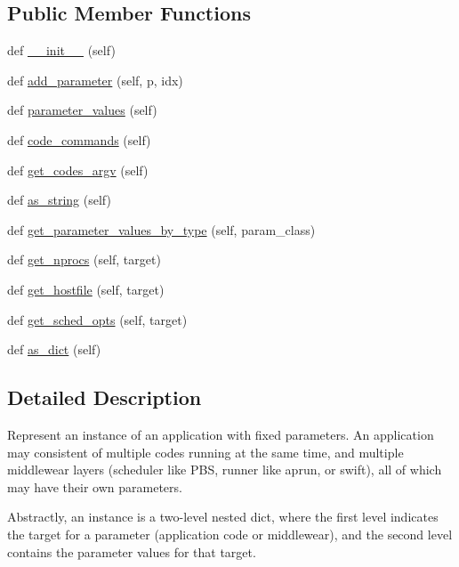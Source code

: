 \subsection*{Public Member Functions}
\begin{DoxyCompactItemize}
\item 
def \hyperlink{classcodar_1_1cheetah_1_1parameters_1_1_instance_abc52192d373d1741efd7566d320d68c1}{\+\_\+\+\_\+init\+\_\+\+\_\+} (self)
\item 
def \hyperlink{classcodar_1_1cheetah_1_1parameters_1_1_instance_a600511535b03f1796f9a0d84b654e113}{add\+\_\+parameter} (self, p, idx)
\item 
def \hyperlink{classcodar_1_1cheetah_1_1parameters_1_1_instance_a4a943c0f5f3afe8b9a4ff9b238aab766}{parameter\+\_\+values} (self)
\item 
def \hyperlink{classcodar_1_1cheetah_1_1parameters_1_1_instance_a417d9d44a5eb0e0b8812fc427ddc4435}{code\+\_\+commands} (self)
\item 
def \hyperlink{classcodar_1_1cheetah_1_1parameters_1_1_instance_a4ee126bbceeb792914185ca9fbe59101}{get\+\_\+codes\+\_\+argv} (self)
\item 
def \hyperlink{classcodar_1_1cheetah_1_1parameters_1_1_instance_a053717fc3ee7840a7c32173f15e99ae3}{as\+\_\+string} (self)
\item 
def \hyperlink{classcodar_1_1cheetah_1_1parameters_1_1_instance_ab1187231851e554aa1e95f7e7eee7b77}{get\+\_\+parameter\+\_\+values\+\_\+by\+\_\+type} (self, param\+\_\+class)
\item 
def \hyperlink{classcodar_1_1cheetah_1_1parameters_1_1_instance_add69b3c4bcc37530ba16bd77cd843872}{get\+\_\+nprocs} (self, target)
\item 
def \hyperlink{classcodar_1_1cheetah_1_1parameters_1_1_instance_a54136234ef868666b93d88f6be0117ff}{get\+\_\+hostfile} (self, target)
\item 
def \hyperlink{classcodar_1_1cheetah_1_1parameters_1_1_instance_a584b71500e5f5ef6bec6d6f2f6bb95ae}{get\+\_\+sched\+\_\+opts} (self, target)
\item 
def \hyperlink{classcodar_1_1cheetah_1_1parameters_1_1_instance_ae978374d4b5e01c2764b9513ae38a961}{as\+\_\+dict} (self)
\end{DoxyCompactItemize}


\subsection{Detailed Description}
\begin{DoxyVerb}Represent an instance of an application with fixed parameters. An
application may consistent of multiple codes running at the same time,
and multiple middlewear layers (scheduler like PBS, runner like aprun,
or swift), all of which may have their own parameters.

Abstractly, an instance is a two-level nested dict, where the first
level indicates the target for a parameter (application code or
middlewear), and the second level contains the parameter values for that
target.
\end{DoxyVerb}
 

